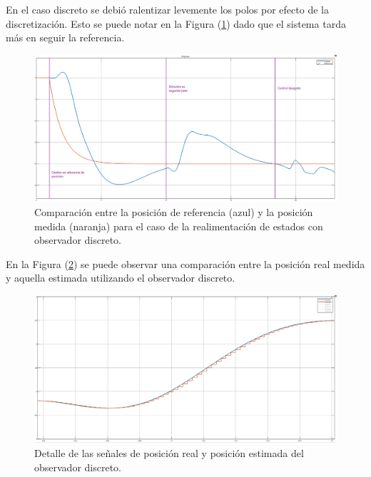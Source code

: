 
En el caso discreto se debió ralentizar levemente los polos por efecto de la discretización. Esto se puede notar en la Figura (\ref{fig:obsv_disc_posref}) dado que el sistema tarda más en seguir la referencia.

\begin{figure}[H]
	\centering
	\includegraphics[width=\linewidth]{../Analisis de Resultados/ImagenesAnalisis de Resultados/obsv_disc_posref.png}
	\caption{Comparación entre la posición de referencia (azul) y la posición medida (naranja) para el caso de la realimentación de estados con observador discreto.}	
	\label{fig:obsv_disc_posref}
\end{figure}

En la Figura (\ref{fig:obsv_disc_posdisc}) se puede observar una comparación entre la posición real medida y aquella estimada utilizando el observador discreto. 

\begin{figure}[H]
	\centering
	\includegraphics[width=\linewidth]{../Analisis de Resultados/ImagenesAnalisis de Resultados/obsv_disc_posdisc.png}
	\caption{Detalle de las señales de posición real y posición estimada del observador discreto.}	
	\label{fig:obsv_disc_posdisc}
\end{figure}

